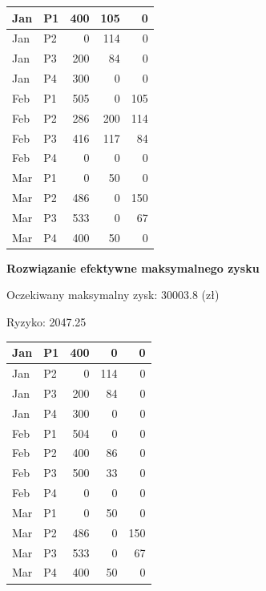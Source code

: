\documentclass[11pt]{article} %
\begin{document}
\begin{center}
    \begin{tabular}{ | l | l | r | r | r | }
    \hline
    Jan & P1 &  400	& 105 	& 0 \\ \hline
    Jan & P2 &  0 		& 114 	& 0 \\ 
    Jan & P3 &  200 	& 84 	& 0 \\ 
    Jan & P4 &  300 	& 0 		& 0 \\ 
    Feb & P1 &  505 	& 0 		& 105 \\ 
    Feb & P2 &  286 	& 200 	& 114 \\
    Feb & P3 &  416 	& 117 	& 84 \\ 
    Feb & P4 &  0 		& 0 		& 0 \\ 
    Mar & P1 &  0 		& 50 	& 0 \\ 
    Mar & P2 &  486 	& 0 		& 150 \\ 
    Mar & P3 &  533 	& 0 		& 67 \\ 
    Mar & P4 &  400 	& 50 	& 0 \\  \hline
   \end{tabular}
\end{center}

\textbf{Rozwiązanie efektywne maksymalnego zysku}

Oczekiwany maksymalny zysk: 30003.8 (zł)

Ryzyko: 2047.25

\begin{center}
    \begin{tabular}{ | l | l | r | r | r | }
    \hline
    Jan & P1 &  400	& 0 	& 0 \\ \hline
    Jan & P2 &  0 		& 114 	& 0 \\ 
    Jan & P3 &  200 	& 84 	& 0 \\ 
    Jan & P4 &  300 	& 0 		& 0 \\ 
    Feb & P1 &  504 	& 0 		& 0 \\ 
    Feb & P2 &  400 	& 86 	& 0 \\
    Feb & P3 &  500 	& 33 	& 0 \\ 
    Feb & P4 &  0 		& 0 		& 0 \\ 
    Mar & P1 &  0 		& 50 	& 0 \\ 
    Mar & P2 &  486 	& 0 		& 150 \\ 
    Mar & P3 &  533 	& 0 		& 67 \\ 
    Mar & P4 &  400 	& 50 	& 0 \\  \hline
    \end{tabular}
\end{center}
\end{document}

